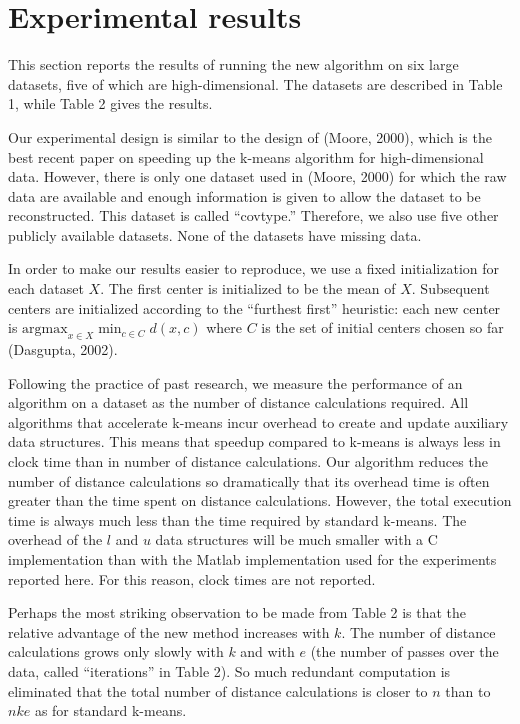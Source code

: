 \chapter{Experimental results}

This section reports the results of running the new algorithm on six large datasets, five of which are high-dimensional. The datasets are described in Table 1, while Table 2 gives the results.

Our experimental design is similar to the design of (Moore, 2000), which is the best recent paper on speeding up the k-means algorithm for high-dimensional data. However, there is only one dataset used in (Moore, 2000) for which the raw data are available and enough information is given to allow the dataset to be reconstructed. This dataset is called ``covtype.'' Therefore, we also use five other publicly available datasets. None of the datasets have missing data.

In order to make our results easier to reproduce, we use a fixed initialization for each dataset \( X \). The first center is initialized to be the mean of \( X \). Subsequent centers are initialized according to the ``furthest first'' heuristic: each new center is \( \mathrm{argmax}_{x \in X} \min_{c \in C} d(x, c) \) where \( C \) is the set of initial centers chosen so far (Dasgupta, 2002).

Following the practice of past research, we measure the performance of an algorithm on a dataset as the number of distance calculations required. All algo\-rithms that accelerate k-means incur overhead to create and update auxiliary data structures. This means that speedup compared to k-means is always less in clock time than in number of distance calculations. Our algorithm reduces the number of distance calculations so dramatically that its overhead time is often greater than the time spent on distance calculations. However, the total execution time is always much less than the time required by standard k-means. The overhead of the \( l \) and \( u \) data structures will be much smaller with a C implementation than with the Matlab implementation used for the experiments reported here. For this reason, clock times are not reported.

Perhaps the most striking observation to be made from Table 2 is that the relative advantage of the new method increases with \( k \). The number of distance calculations grows only slowly with \( k \) and with \( e \) (the number of passes over the data, called ``iterations'' in Table 2). So much redundant computation is eliminated that the total number of distance calculations is closer to \( n \) than to \( nke \) as for standard k-means.

